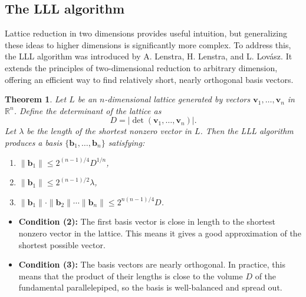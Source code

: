 \documentclass[a4paper,12pt]{article}
\newtheorem{theorem}{Theorem}
\begin{document}
\subsection{The LLL algorithm}

Lattice reduction in two dimensions provides useful intuition, but generalizing these ideas to higher dimensions is significantly more complex. To address this, the LLL algorithm was introduced by A. Lenstra, H. Lenstra, and L. Lovász. It extends the principles of two-dimensional reduction to arbitrary dimension, offering an efficient way to find relatively short, nearly orthogonal basis vectors.

\begin{theorem}
Let $L$ be an $n$-dimensional lattice generated by vectors $\mathbf{v}_1, \dots, \mathbf{v}_n$ in $\mathbb{R}^n$. Define the determinant of the lattice as
\[
D = |\det(\mathbf{v}_1, \dots, \mathbf{v}_n)|.
\]
Let $\lambda$ be the length of the shortest nonzero vector in $L$. Then the LLL algorithm produces a basis $\{\mathbf{b}_1, \dots, \mathbf{b}_n\}$ satisfying:
\begin{enumerate}
    \item $\|\mathbf{b}_1\| \leq 2^{(n-1)/4} D^{1/n}$,
    \item $\|\mathbf{b}_1\| \leq 2^{(n-1)/2} \lambda$,
    \item $\|\mathbf{b}_1\| \cdot \|\mathbf{b}_2\| \cdots \|\mathbf{b}_n\| \leq 2^{n(n-1)/4} D$.
\end{enumerate}
\end{theorem}

\noindent
\begin{itemize}
  \item \textbf{Condition (2):} The first basis vector is close in length to the shortest nonzero vector in the lattice. This means it gives a good approximation of the shortest possible vector.
  
  \item \textbf{Condition (3):} The basis vectors are nearly orthogonal. In practice, this means that the product of their lengths is close to the volume $D$ of the fundamental parallelepiped, so the basis is well-balanced and spread out.
\end{itemize}
\end{document}
